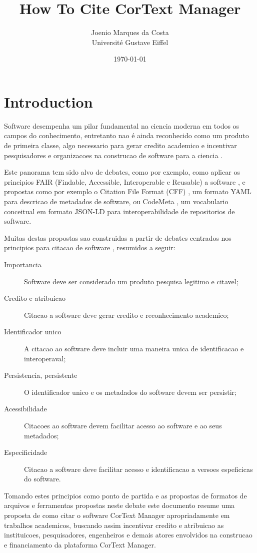 \documentclass{article}
\title{
  How To Cite CorText Manager
}
\author{
  Joenio Marques da Costa \\
  Université Gustave Eiffel
}
\date{\today}
\begin{document}
\maketitle

\section{Introduction}

Software desempenha um pilar fundamental na ciencia moderna em todos os campos
do conhecimento, entretanto nao é ainda reconhecido como um produto de
primeira classe, algo necessario para gerar credito academico e incentivar
pesquisadores e organizacoes na construcao de software para a
ciencia \cite{alliez_attributing_2020}.

Este panorama tem sido alvo de debates, como por exemplo,
como aplicar os principios FAIR (Findable,
Accessible, Interoperable e Reusable) a software \cite{noauthor_fair_nodate},
e propostas como por exemplo o Citation
File Format (CFF) \cite{chue_hong_software_2019}, um
formato YAML para descricao de metadados de software, ou
CodeMeta \cite{druskat_citation_2019}, um vocabulario conceitual em
formato JSON-LD para interoperabilidade de repositorios de software.

Muitas destas propostas sao construidas a partir de debates centrados nos principios para citacao de software \cite{smith_software_2016}, resumidos a seguir:

\begin{description}
  \item[Importancia] Software deve ser considerado um produto pesquisa legitimo e citavel;
  \item[Credito e atribuicao] Citacao a software deve gerar credito e reconhecimento academico;
  \item[Identificador unico] A citacao ao software deve incluir uma maneira unica de identificacao e interoperaval;
  \item[Persistencia, persistente] O identificador unico e os metadados do software devem ser persistir;
  \item[Acessibilidade] Citacoes ao software devem facilitar acesso ao software e ao seus metadados;
  \item[Especificidade] Citacao a software deve facilitar acesso e identificacao a versoes espeficicas do software.
\end{description}

Tomando estes principios como ponto de partida e as propostas de formatos de
arquivos e ferramentas propostas neste debate este documento resume uma
proposta de como citar o software CorText Manager apropriadamente em trabalhos
academicos, buscando assim incentivar credito e atribuicao as instituicoes,
pesquisadores, engenheiros e demais atores envolvidos na construcao e
financiamento da plataforma CorText Manager.
\end{document}
